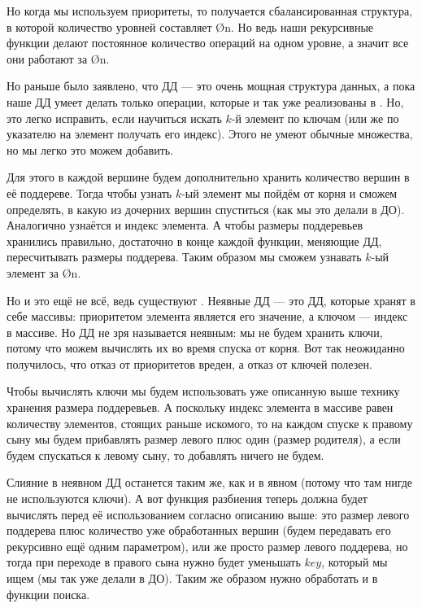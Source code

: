 Но когда мы используем приоритеты, то получается сбалансированная структура, в которой количество уровней составляет \O{\log n}. Но ведь наши рекурсивные функции делают постоянное количество операций на одном уровне, а значит все они работают за \O{\log n}.

Но раньше было заявлено, что ДД — это очень мощная структура данных, а пока наше ДД умеет делать только операции, которые и так уже реализованы в . Но, это легко исправить, если научиться искать $k$-й элемент по ключам (или же по указателю на элемент получать его индекс). Этого не умеют обычные множества, но мы легко это можем добавить.

Для этого в каждой вершине будем дополнительно хранить количество вершин в её поддереве. Тогда чтобы узнать $k$-ый элемент мы пойдём от корня и сможем определять, в какую из дочерних вершин спуститься (как мы это делали в ДО). Аналогично узнаётся и индекс элемента. А чтобы размеры поддеревьев хранились правильно, достаточно в конце каждой функции, меняющие ДД, пересчитывать размеры поддерева. Таким образом мы сможем узнавать $k$-ый элемент за \O{\log n}.

Но и это ещё не всё, ведь существуют . Неявные ДД — это ДД, которые хранят в себе массивы: приоритетом элемента является его значение, а ключом — индекс в массиве. Но ДД не зря называется неявным: мы не будем хранить ключи, потому что можем вычислять их во время спуска от корня. Вот так неожиданно получилось, что отказ от приоритетов вреден, а отказ от ключей полезен.

Чтобы вычислять ключи мы будем использовать уже описанную выше технику хранения размера поддеревьев. А поскольку индекс элемента в массиве равен количеству элементов, стоящих раньше искомого, то на каждом спуске к правому сыну мы будем прибавлять размер левого плюс один (размер родителя), а если будем спускаться к левому сыну, то добавлять ничего не будем.

Слияние в неявном ДД останется таким же, как и в явном (потому что там нигде не используются ключи). А вот функция разбиения теперь должна будет вычислять  перед её использованием согласно описанию выше: это размер левого поддерева плюс количество уже обработанных вершин (будем передавать его рекурсивно ещё одним параметром), или же просто размер левого поддерева, но тогда при переходе в правого сына нужно будет уменьшать $key$, который мы ищем (мы так уже делали в ДО). Таким же образом нужно обработать и  в функции поиска.

